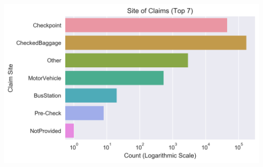 \documentclass{beamer}
\begin{document}
\begin{frame}
	\includegraphics[keepaspectratio, width = \textwidth, height = \textheight]{../plots/log_sites}
\end{frame}
\end{document}
